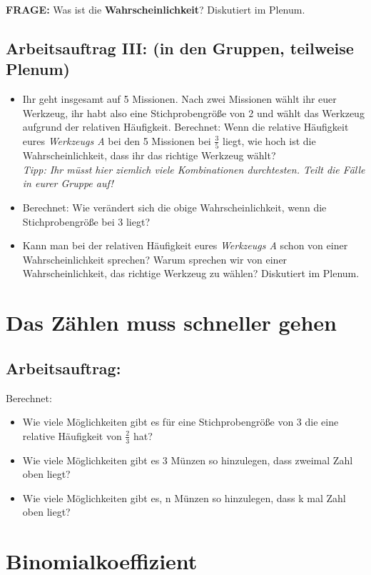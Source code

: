 \documentclass[]{article}
\begin{document}
\textbf{FRAGE:} Was ist die \textbf{Wahrscheinlichkeit}? Diskutiert im Plenum. 

\subsection*{Arbeitsauftrag III: (in den Gruppen, teilweise Plenum)}
\begin{itemize}
	\item Ihr geht insgesamt auf 5 Missionen. Nach zwei Missionen wählt ihr euer Werkzeug, ihr habt also eine Stichprobengröße von 2 und wählt das Werkzeug aufgrund der relativen Häufigkeit. Berechnet: Wenn die relative Häufigkeit eures \textit{Werkzeugs A} bei den 5 Missionen bei $\frac{3}{5}$ liegt, wie hoch ist die Wahrscheinlichkeit, dass ihr das richtige Werkzeug wählt?\\
	\textit{Tipp: Ihr müsst hier ziemlich viele Kombinationen durchtesten. Teilt die Fälle in eurer Gruppe auf!}
	\item Berechnet: Wie verändert sich die obige Wahrscheinlichkeit, wenn die Stichprobengröße bei 3 liegt?
	\item Kann man bei der relativen Häufigkeit eures \textit{Werkzeugs A} schon von einer Wahrscheinlichkeit sprechen? Warum sprechen wir von einer Wahrscheinlichkeit, das richtige Werkzeug zu wählen? Diskutiert im Plenum.
\end{itemize}

\section*{Das Zählen muss schneller gehen}
\subsection*{Arbeitsauftrag:}
Berechnet:
\begin{itemize}
	\item Wie viele Möglichkeiten gibt es für eine Stichprobengröße von 3 die eine relative Häufigkeit von $\frac{2}{3}$ hat?
	\item Wie viele Möglichkeiten gibt es 3 Münzen so hinzulegen, dass zweimal Zahl oben liegt?
	\item Wie viele Möglichkeiten gibt es, n Münzen so hinzulegen, dass k mal Zahl oben liegt?
\end{itemize}


\section*{Binomialkoeffizient}
\end{document}
